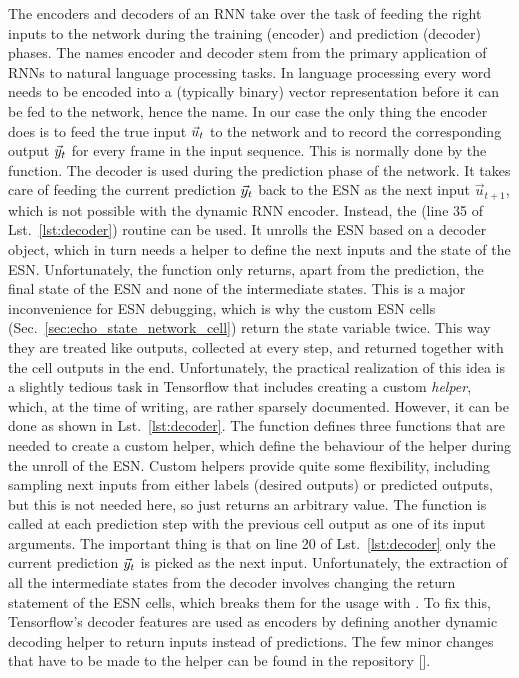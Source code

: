 The encoders and decoders of an RNN take over the task of feeding the right
inputs to the network during the training (encoder) and prediction (decoder)
phases. The names encoder and decoder stem from the primary application of RNNs to
natural language processing tasks.  In language processing every word needs to
be encoded into a (typically binary) vector representation before it can be fed
to the network, hence the name. In our case the only thing the encoder does is
to feed the true input $\vec{u}_t$ to the network and to record the corresponding
output $\vec{y}_t$ for every frame in the input sequence. This is normally done by
the  function.  The decoder is used during the
prediction phase of the network.  It takes care of feeding the current
prediction $\vec{y}_t$ back to the ESN as the next input $\vec{u}_{t+1}$, which is
not possible with the dynamic RNN encoder.  Instead, the
 (line 35 of Lst.~\ref{lst:decoder})
routine can be used. It unrolls the ESN based on a decoder object, which in
turn needs a helper to define the next inputs and the state of the ESN.
Unfortunately, the  function only returns, apart from
the prediction, the final state of the ESN and none of the intermediate states.
This is a major inconvenience for ESN debugging, which is why the custom ESN
cells (Sec.~\ref{sec:echo_state_network_cell}) return the state variable twice.
This way they are treated like outputs, collected at every step, and
returned together with the cell outputs in the end.  Unfortunately, the
practical realization of this idea is a slightly tedious task in Tensorflow
that includes creating a custom \emph{helper}, which, at the time of writing,
are rather sparsely documented.  However, it can be done as shown in
Lst.~\ref{lst:decoder}. The  function defines three
functions that are needed to create a custom helper, which define the behaviour
of the helper during the unroll of the ESN.  Custom helpers provide quite some
flexibility, including sampling next inputs from either labels (desired
outputs) or predicted outputs, but this is not needed here, so 
just returns an arbitrary value.  The  function is called
at each prediction step with the previous cell output as one of its input
arguments.  The important thing is that on line 20 of Lst.~\ref{lst:decoder}
only the current prediction $\vec{y}_t$ is picked as the next input.
Unfortunately, the extraction of all the intermediate states from the decoder
involves changing the return statement of the ESN cells, which breaks them for
the usage with . To fix this, Tensorflow's decoder
features are used as encoders by defining another dynamic decoding helper to
return inputs instead of predictions.  The few minor changes that have to be
made to the helper can be found in the repository [\cite{coderepo}].



